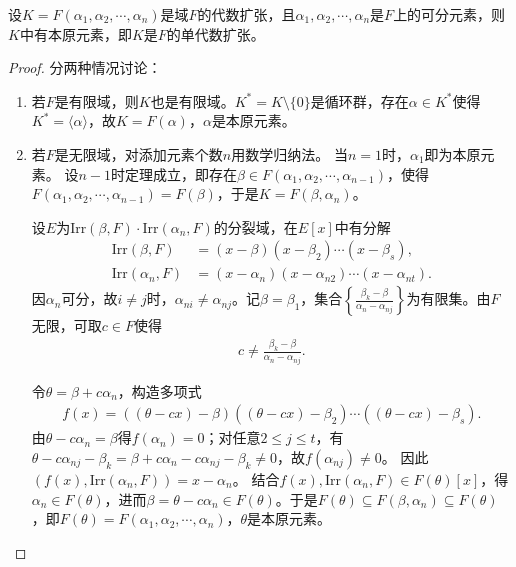 \documentclass[../../main.tex]{subfiles}%
\begin{document}
\begin{theorem}
设$K=F(\alpha_1,\alpha_2,\cdots,\alpha_n)$是域$F$的代数扩张，且$\alpha_1,\alpha_2,\cdots,\alpha_n$是$F$上的可分元素，则$K$中有本原元素，即$K$是$F$的单代数扩张。
\end{theorem}
\begin{proof}

分两种情况讨论：
\begin{enumerate}[(1)]
\item 若$F$是有限域，则$K$也是有限域。$K^*=K\setminus\{0\}$是循环群，存在$\alpha\in K^*$使得$K^*=\langle\alpha\rangle$，故$K=F(\alpha)$，$\alpha$是本原元素。
\item 若$F$是无限域，对添加元素个数$n$用数学归纳法。
当$n=1$时，$\alpha_1$即为本原元素。
设$n-1$时定理成立，即存在$\beta\in F(\alpha_1,\alpha_2,\cdots,\alpha_{n-1})$，使得$F(\alpha_1,\alpha_2,\cdots,\alpha_{n-1})=F(\beta)$，于是$K=F(\beta,\alpha_n)$。

设$E$为$\mathrm{Irr}(\beta,F)\cdot\mathrm{Irr}(\alpha_n,F)$的分裂域，在$E[x]$中有分解
\begin{align*}
\mathrm{Irr}(\beta,F)&=(x-\beta)(x-\beta_2)\cdots(x-\beta_s),\\
\mathrm{Irr}(\alpha_n,F)&=(x-\alpha_n)(x-\alpha_{n2})\cdots(x-\alpha_{nt}).
\end{align*}
因$\alpha_n$可分，故$i\neq j$时，$\alpha_{ni}\neq\alpha_{nj}$。记$\beta=\beta_1$，集合$\left\{\frac{\beta_k-\beta}{\alpha_n-\alpha_{nj}}\right\}$为有限集。由$F$无限，可取$c\in F$使得
\begin{align*}
c\neq\frac{\beta_k-\beta}{\alpha_n-\alpha_{nj}}.
\end{align*}

令$\theta=\beta+c\alpha_n$，构造多项式
\begin{align*}
f(x)=((\theta-cx)-\beta)((\theta-cx)-\beta_2)\cdots((\theta-cx)-\beta_s).
\end{align*}
由$\theta-c\alpha_n=\beta$得$f(\alpha_n)=0$；对任意$2\leqslant j\leqslant t$，有$\theta-c\alpha_{nj}-\beta_k=\beta+c\alpha_n-c\alpha_{nj}-\beta_k\neq0$，故$f(\alpha_{nj})\neq0$。
因此$(f(x),\mathrm{Irr}(\alpha_n,F))=x-\alpha_n$。
结合$f(x),\mathrm{Irr}(\alpha_n,F)\in F(\theta)[x]$，得$\alpha_n\in F(\theta)$，进而$\beta=\theta-c\alpha_n\in F(\theta)$。于是$F(\theta)\subseteq F(\beta,\alpha_n)\subseteq F(\theta)$，即$F(\theta)=F(\alpha_1,\alpha_2,\cdots,\alpha_n)$，$\theta$是本原元素。
\end{enumerate}

\end{proof}
\end{document}
